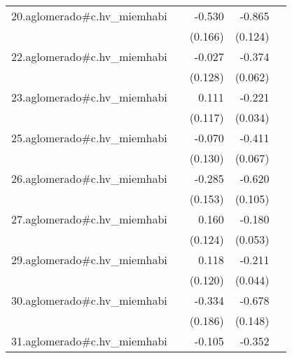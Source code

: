 {\begin{longtable}{l*{4}{D{.}{.}{-1}}}
\addlinespace
20.aglomerado#c.hv\_miemhabi&                     &      -0.530\sym{**} &      -0.865\sym{***}&                     \\
            &                     &     (0.166)         &     (0.124)         &                     \\
\addlinespace
22.aglomerado#c.hv\_miemhabi&                     &      -0.027         &      -0.374\sym{***}&                     \\
            &                     &     (0.128)         &     (0.062)         &                     \\
\addlinespace
23.aglomerado#c.hv\_miemhabi&                     &       0.111         &      -0.221\sym{***}&                     \\
            &                     &     (0.117)         &     (0.034)         &                     \\
\addlinespace
25.aglomerado#c.hv\_miemhabi&                     &      -0.070         &      -0.411\sym{***}&                     \\
            &                     &     (0.130)         &     (0.067)         &                     \\
\addlinespace
26.aglomerado#c.hv\_miemhabi&                     &      -0.285         &      -0.620\sym{***}&                     \\
            &                     &     (0.153)         &     (0.105)         &                     \\
\addlinespace
27.aglomerado#c.hv\_miemhabi&                     &       0.160         &      -0.180\sym{***}&                     \\
            &                     &     (0.124)         &     (0.053)         &                     \\
\addlinespace
29.aglomerado#c.hv\_miemhabi&                     &       0.118         &      -0.211\sym{***}&                     \\
            &                     &     (0.120)         &     (0.044)         &                     \\
\addlinespace
30.aglomerado#c.hv\_miemhabi&                     &      -0.334         &      -0.678\sym{***}&                     \\
            &                     &     (0.186)         &     (0.148)         &                     \\
\addlinespace
31.aglomerado#c.hv\_miemhabi&                     &      -0.105         &      -0.352\sym{***}&                     \\

\end{longtable}}
